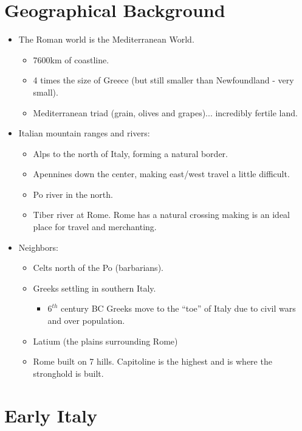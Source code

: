 \documentclass[12pt, twoside]{article}
\begin{document}
\section{Geographical Background}
\begin{itemize}
\item The Roman world is the Mediterranean World.
	\begin{itemize}
	\item 7600km of coastline.
	\item 4 times the size of Greece (but still smaller than Newfoundland - very small).
	\item Mediterranean triad (grain, olives and grapes)... incredibly fertile land.
	\end{itemize}
\item Italian mountain ranges and rivers:
	\begin{itemize}
	\item Alps to the north of Italy, forming a natural border.
	\item Apennines down the center, making east/west travel a little difficult.
	\item Po river in the north.
	\item Tiber river at Rome.  Rome has a natural crossing making is an ideal place for travel and merchanting.
	\end{itemize}
\item Neighbors:
	\begin{itemize}
	\item Celts north of the Po (barbarians).
	\item Greeks settling in southern Italy.
		\begin{itemize}
		\item $6^{th}$ century BC Greeks move to the ``toe'' of Italy due to civil wars and over population.
		\end{itemize}
	\item Latium (the plains surrounding Rome)
	\item Rome built on 7 hills.  Capitoline is the highest and is where the stronghold is built.
	\end{itemize}
\end{itemize}

\section{Early Italy}
\end{document}
